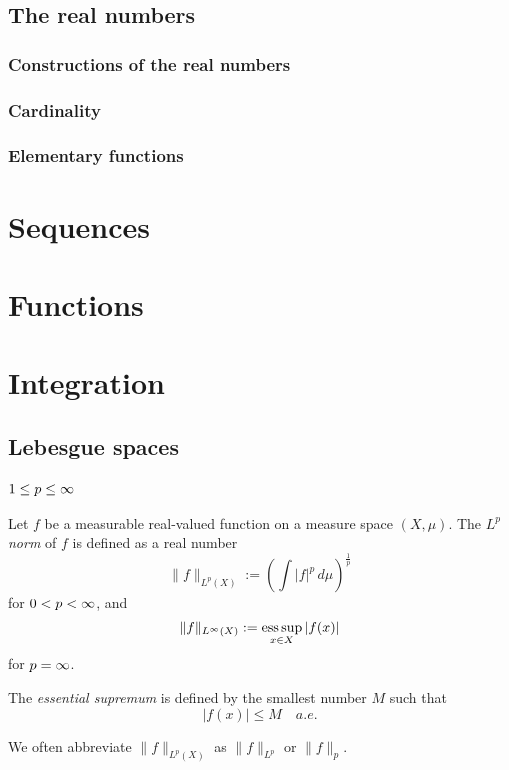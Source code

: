 \documentclass{../crs}
\begin{document}
\section{The real numbers}
\subsection{Constructions of the real numbers}

\subsection{Cardinality}

\subsection{Elementary functions}





\chapter{Sequences}


\chapter{Functions}


\chapter{Integration}




\section{Lebesgue spaces}

\subsection{$1\le p\le\infty$}

\begin{defn}
Let $f$ be a measurable real-valued function on a measure space $(X,\mu)$.
The \emph{$L^p$ norm} of $f$ is defined as a real number
\[\|f\|_{L^p(X)}:=(\int|f|^p\,d\mu)^{\frac1p}\]
for $0<p<\infty$, and
\[\|f\|_{L^\infty(X)}:=\operatorname*{ess\,sup}_{x\in X}|f(x)|\]
for $p=\infty$.
\end{defn}
\begin{defn}
The \emph{essential supremum} is defined by the smallest number $M$ such that
\[|f(x)|\le M\quad a.e.\]
\end{defn}
We often abbreviate $\|f\|_{L^p(X)}$ as $\|f\|_{L^p}$ or $\|f\|_p$.
\end{document}
